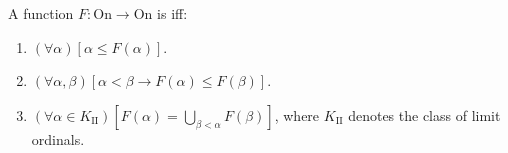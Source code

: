 A function $F: \mathrm{On} \to \mathrm{On}$ is  iff:
\begin{enumerate}
\item $(\forall \alpha)[\alpha \leq F(\alpha)]$.
\item $(\forall \alpha, \beta)[\alpha < \beta \to F(\alpha) \leq F(\beta)]$.
\item $(\forall \alpha \in K_{\mathrm{II}})\left[F(\alpha) = \bigcup_{\beta < \alpha} F(\beta)\right]$, where $K_{\mathrm{II}}$ denotes the class of limit ordinals.
\end{enumerate}

